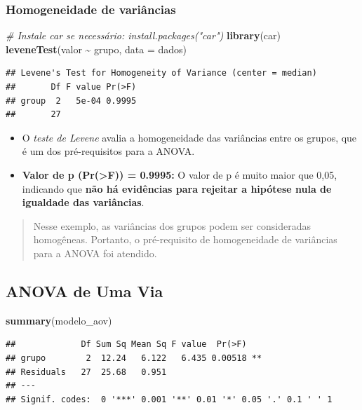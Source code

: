\documentclass[
]{book}
\newenvironment{Shaded}{\begin{snugshade}}{\end{snugshade}}
\newcommand{\AttributeTok}[1]{\textcolor[rgb]{0.13,0.29,0.53}{#1}}
\newcommand{\CommentTok}[1]{\textcolor[rgb]{0.56,0.35,0.01}{\textit{#1}}}
\newcommand{\FunctionTok}[1]{\textcolor[rgb]{0.13,0.29,0.53}{\textbf{#1}}}
\newcommand{\NormalTok}[1]{#1}
\newcommand{\SpecialCharTok}[1]{\textcolor[rgb]{0.81,0.36,0.00}{\textbf{#1}}}
\begin{document}
\subsubsection{Homogeneidade de variâncias}\label{homogeneidade-de-variuxe2ncias}

\begin{Shaded}
\begin{Highlighting}[]
\CommentTok{\# Instale \textquotesingle{}car\textquotesingle{} se necessário: install.packages("car")}
\FunctionTok{library}\NormalTok{(car)}
\FunctionTok{leveneTest}\NormalTok{(valor }\SpecialCharTok{\textasciitilde{}}\NormalTok{ grupo, }\AttributeTok{data =}\NormalTok{ dados)}
\end{Highlighting}
\end{Shaded}

\begin{verbatim}
## Levene's Test for Homogeneity of Variance (center = median)
##       Df F value Pr(>F)
## group  2   5e-04 0.9995
##       27
\end{verbatim}

\begin{itemize}
\item
  O \emph{teste de Levene} avalia a homogeneidade das variâncias entre os grupos, que é um dos pré-requisitos para a ANOVA.
\item
  \textbf{Valor de p (Pr(\textgreater F)) = 0.9995:} O valor de p é muito maior que 0,05, indicando que \textbf{não há evidências para rejeitar a hipótese nula de igualdade das variâncias}.
\end{itemize}

\begin{quote}
Nesse exemplo, as variâncias dos grupos podem ser consideradas homogêneas. Portanto, o pré-requisito de homogeneidade de variâncias para a ANOVA foi atendido.
\end{quote}

\subsection{ANOVA de Uma Via}\label{anova-de-uma-via}

\begin{Shaded}
\begin{Highlighting}[]
\FunctionTok{summary}\NormalTok{(modelo\_aov)}
\end{Highlighting}
\end{Shaded}

\begin{verbatim}
##             Df Sum Sq Mean Sq F value  Pr(>F)   
## grupo        2  12.24   6.122   6.435 0.00518 **
## Residuals   27  25.68   0.951                   
## ---
## Signif. codes:  0 '***' 0.001 '**' 0.01 '*' 0.05 '.' 0.1 ' ' 1
\end{verbatim}
\end{document}
